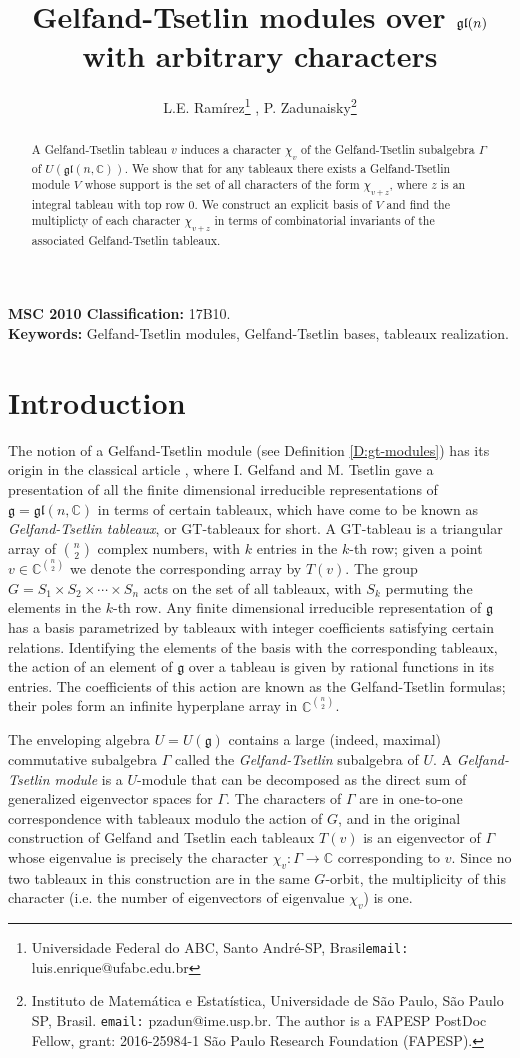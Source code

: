 \documentclass[11pt,fleqn]{article}
\title{Gelfand-Tsetlin modules over $\gl(n)$ with arbitrary characters}
\author{L.E. Ram\'irez\footnote{Universidade Federal do ABC, Santo Andr\'e-SP, 
Brasil\texttt{email:} luis.enrique@ufabc.edu.br} , 
P. Zadunaisky\footnote{Instituto de Matem\'atica e Estat\'istica, Universidade 
de S\~ao Paulo,  S\~ao Paulo SP, Brasil. \texttt{email:} pzadun@ime.usp.br.
The author is a FAPESP PostDoc Fellow, grant: 2016-25984-1 
S\~ao Paulo Research Foundation (FAPESP).}
}
\newcounter{para}[section]
\newcommand\CC{\mathbb C}
\renewcommand\to{\longrightarrow}
\newcommand\g{\mathfrak g}
\newcommand\gl{\mathfrak{gl}}
\begin{document}
\maketitle

\begin{abstract}
A Gelfand-Tsetlin tableau $v$ induces a character $\chi_v$ of the 
Gelfand-Tsetlin subalgebra $\Gamma$ of $U(\gl(n,\CC))$. We show that for any 
tableaux there exists a Gelfand-Tsetlin module $V$ whose support is the set of
all characters of the form $\chi_{v+z}$, where $z$ is an integral tableau with 
top row $0$. We construct an explicit basis of $V$ and find the multiplicty of 
each character $\chi_{v+z}$ in terms of combinatorial invariants of the 
associated Gelfand-Tsetlin tableaux.
\end{abstract}
\noindent\textbf{MSC 2010 Classification:} 17B10.\\
\noindent\textbf{Keywords:} Gelfand-Tsetlin modules, Gelfand-Tsetlin bases,
tableaux realization.

\section{Introduction}
The notion of a Gelfand-Tsetlin module (see Definition \ref{D:gt-modules}) has 
its origin in the classical article \cite{GT-modules}, where I. Gelfand and M. 
Tsetlin gave a presentation of all the finite dimensional irreducible 
representations of $\g = \gl(n,\CC)$ in terms of certain tableaux, which have 
come to be known as \emph{Gelfand-Tsetlin tableaux}, or GT-tableaux for short. 
A GT-tableau is a triangular array of $\binom{n}{2}$ complex numbers, with $k$ 
entries in the $k$-th row; given a point $v \in \CC^{\binom{n}{2}}$ we denote 
the corresponding array by $T(v)$. The group $G = S_1 \times S_2 \times \cdots 
\times S_n$ acts on the set of all tableaux, with $S_k$ permuting the elements 
in the $k$-th row. Any finite dimensional irreducible representation of $\g$ 
has a basis parametrized by tableaux with integer coefficients satisfying 
certain relations. Identifying the elements of the basis with the 
corresponding tableaux, the action of an element of $\g$ over a 
tableau is given by rational functions in its entries. The coefficients of
this action are known as the Gelfand-Tsetlin formulas; their poles form an 
infinite hyperplane array in $\CC^{\binom{n}{2}}$.

The enveloping algebra $U = U(\g)$ contains a large (indeed, maximal) 
commutative subalgebra $\Gamma$ called the \emph{Gelfand-Tsetlin} subalgebra 
of $U$. A \emph{Gelfand-Tsetlin module} is a $U$-module that can be
decomposed as the direct sum of generalized eigenvector spaces for $\Gamma$.
The characters of $\Gamma$ are in one-to-one correspondence with tableaux 
modulo the action of $G$, and in the original construction of Gelfand and 
Tsetlin each tableaux $T(v)$ is an eigenvector of $\Gamma$ whose eigenvalue
is precisely the character $\chi_v: \Gamma \to \CC$ corresponding to $v$. 
Since no two tableaux in this construction are in the same $G$-orbit, the 
multiplicity of this character (i.e. the number of eigenvectors
of eigenvalue $\chi_v$) is one.
\end{document}
